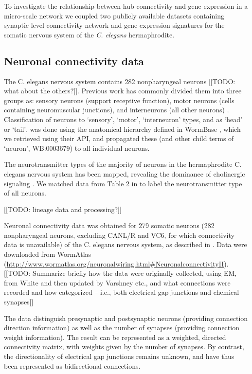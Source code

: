 \documentclass[10pt,letterpaper]{article}
\begin{document}
To investigate the relationship between hub connectivity and gene expression in a micro-scale network we coupled two publicly available datasets containing synaptic-level connectivity network and gene expression signatures for the somatic nervous system of the \textit{C. elegans} hermaphrodite.

\subsection*{Neuronal connectivity data}

The C. elegans nervous system contains 282 nonpharyngeal neurons [[TODO: what about the others?]].
Previous work has commonly divided them into three groups as:
sensory neurons (support receptive function),
motor neurons (cells containing neuromuscular junctions),
and interneurons (all other neurons) \cite{White:1986tx}.
Classification of neurons to `sensory', `motor', `interneuron' types, and as `head' or `tail', was done using the anatomical hierarchy defined in WormBase \cite{Harris:2009kd}, which we retrieved using their API, and propagated these (and other child terms of `neuron', WB:0003679) to all individual neurons. %

The neurotransmitter types of the majority of neurons in the hermaphrodite C. elegans nervous system has been mapped, revealing the dominance of cholinergic signaling \cite{Pereira:2015er}.
We matched data from Table 2 in \citet{Pereira:2015er} to label the neurotransmitter type of all neurons.

[[TODO: lineage data and processing?]]

Neuronal connectivity data was obtained for 279 somatic neurons (282 nonpharyngeal neurons, excluding CANL/R and VC6, for which connectivity data is unavailable) of the C. elegans nervous system, as described in \citet{Varshney2011}.
Data were downloaded from WormAtlas (\url{http://www.wormatlas.org/neuronalwiring.html#NeuronalconnectivityII}).
[[TODO: Summarize briefly how the data were originally collected, using EM, from White and then updated by Varshney etc., and what connections were recorded and how categorized -- i.e., both electrical gap junctions and chemical synapses]]

The data distinguish presynaptic and postsynaptic neurons (providing connection direction information) as well as the number of synapses (providing connection weight information).
The result can be represented as a weighted, directed connectivity matrix, with weights given by the number of synapses.
By contrast, the directionality of electrical gap junctions remains unknown, and have thus been represented as bidirectional connections.
\end{document}
